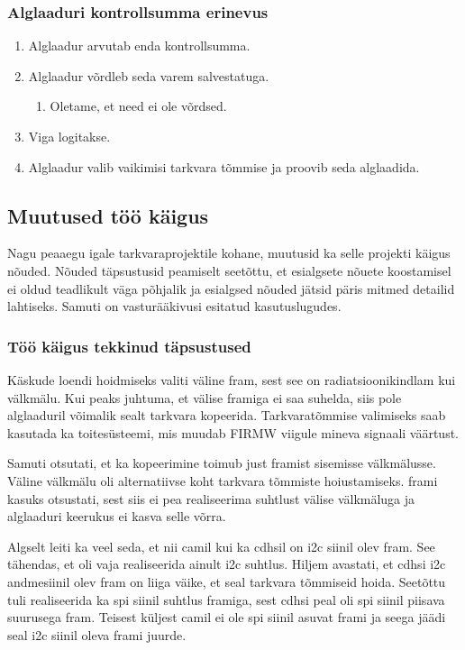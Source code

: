 \documentclass[12pt,a4paper]{article}
\begin{document}
\subsubsection{Alglaaduri kontrollsumma erinevus}
\begin{enumerate}
	\item Alglaadur arvutab enda kontrollsumma.
	\item Alglaadur võrdleb seda varem salvestatuga.
		\begin{enumerate}
			\item Oletame, et need ei ole võrdsed.
		\end{enumerate}
	\item Viga logitakse.
	\item Alglaadur valib vaikimisi tarkvara tõmmise ja proovib seda alglaadida.
\end{enumerate}

\subsection{Muutused töö käigus}
Nagu peaaegu igale tarkvaraprojektile kohane, muutusid ka selle projekti käigus
nõuded. Nõuded täpsustusid peamiselt seetõttu, et esialgsete nõuete koostamisel
ei oldud teadlikult väga põhjalik ja esialgsed nõuded jätsid päris mitmed
detailid lahtiseks. Samuti on vasturääkivusi esitatud kasutuslugudes.

\subsubsection{Töö käigus tekkinud täpsustused}
Käskude loendi hoidmiseks valiti väline \gls{fram}, sest see on
radiatsioonikindlam kui välkmälu. Kui peaks juhtuma, et välise \gls{fram}iga ei
saa suhelda, siis pole alglaaduril võimalik sealt tarkvara kopeerida.
Tarkvaratõmmise valimiseks saab kasutada ka toitesüsteemi, mis muudab FIRMW
viigule mineva signaali väärtust.

Samuti otsutati, et ka kopeerimine toimub just \gls{fram}ist sisemisse
välk\-mä\-lusse. Väline välkmälu oli alternatiivse koht tarkvara tõmmiste
hoiustamiseks. \Gls{fram}i kasuks otsustati, sest siis ei pea realiseerima
suhtlust välise välkmäluga ja alglaaduri keerukus ei kasva selle võrra.

Algselt leiti ka veel seda, et nii \gls{cam}il kui ka \gls{cdhs}il on \gls{i2c}
siinil olev \gls{fram}.  See tähendas, et oli vaja realiseerida ainult \gls{i2c}
suhtlus. Hiljem avastati, et \gls{cdhs}i \gls{i2c} andmesiinil olev
\gls{fram} on liiga väike, et seal tarkvara tõmmiseid hoida.  Seetõttu tuli
realiseerida ka \gls{spi} siinil suhtlus \gls{fram}iga, sest \gls{cdhs}i peal
oli \gls{spi} siinil piisava suurusega \gls{fram}. Teisest küljest \gls{cam}il
ei ole \gls{spi} siinil asuvat \gls{fram}i ja seega jäädi seal \gls{i2c} siinil
oleva \gls{fram}i juurde.
\end{document}
